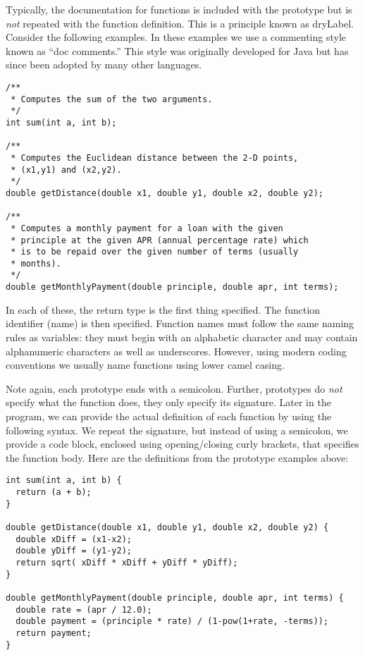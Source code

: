 Typically, the documentation for functions is included with the prototype
but is \emph{not} repeated with the function definition.  This is a 
principle known as \gls{dryLabel}.  Consider the following examples.
In these examples we use a commenting style known as ``doc comments.''
This style was originally developed for Java but has since been 
adopted by many other languages.

\begin{verbatim}
/**
 * Computes the sum of the two arguments.
 */
int sum(int a, int b);

/**
 * Computes the Euclidean distance between the 2-D points, 
 * (x1,y1) and (x2,y2).
 */
double getDistance(double x1, double y1, double x2, double y2);

/**
 * Computes a monthly payment for a loan with the given
 * principle at the given APR (annual percentage rate) which
 * is to be repaid over the given number of terms (usually
 * months).
 */
double getMonthlyPayment(double principle, double apr, int terms);
\end{verbatim}

In each of these, the return type is the first thing specified.  The 
function identifier (name) is then specified.  Function names must
follow the same naming rules as variables: they must begin with
an alphabetic character and may contain alphanumeric characters
as well as underscores.  However, using modern coding conventions 
we usually name functions using lower camel casing.

Note again, each prototype ends with a semicolon.  Further, 
prototypes do \emph{not} specify what the function does, they
only specify its signature.  Later in the program, we can provide
the actual definition of each function by using the following syntax.
We repeat the signature, but instead of using a semicolon, we provide
a code block, enclosed using opening/closing curly brackets, that
specifies the function body.  Here are the definitions from the 
prototype examples above:

\begin{verbatim}
int sum(int a, int b) {
  return (a + b);
}

double getDistance(double x1, double y1, double x2, double y2) {
  double xDiff = (x1-x2);
  double yDiff = (y1-y2);
  return sqrt( xDiff * xDiff + yDiff * yDiff);
}

double getMonthlyPayment(double principle, double apr, int terms) {
  double rate = (apr / 12.0);
  double payment = (principle * rate) / (1-pow(1+rate, -terms));
  return payment;
}
\end{verbatim}

